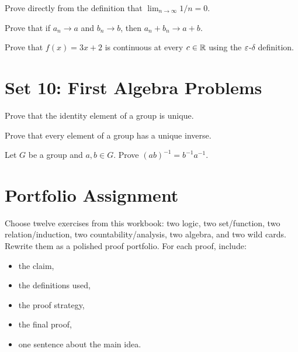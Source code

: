 \documentclass[11pt]{article}
\begin{document}
\begin{exercise}
Prove directly from the definition that $\lim_{n\to\infty}1/n=0$.
\end{exercise}

\begin{exercise}
Prove that if $a_n\to a$ and $b_n\to b$, then $a_n+b_n\to a+b$.
\end{exercise}

\begin{exercise}
Prove that $f(x)=3x+2$ is continuous at every $c\in\mathbb{R}$ using the $\varepsilon$-$\delta$ definition.
\end{exercise}

\section{Set 10: First Algebra Problems}

\begin{exercise}
Prove that the identity element of a group is unique.
\end{exercise}

\begin{exercise}
Prove that every element of a group has a unique inverse.
\end{exercise}

\begin{exercise}
Let $G$ be a group and $a,b\in G$. Prove $(ab)^{-1}=b^{-1}a^{-1}$.
\end{exercise}

\section{Portfolio Assignment}

Choose twelve exercises from this workbook: two logic, two set/function, two relation/induction, two countability/analysis, two algebra, and two wild cards. Rewrite them as a polished proof portfolio. For each proof, include:

\begin{itemize}
\item the claim,
\item the definitions used,
\item the proof strategy,
\item the final proof,
\item one sentence about the main idea.
\end{itemize}
\end{document}
